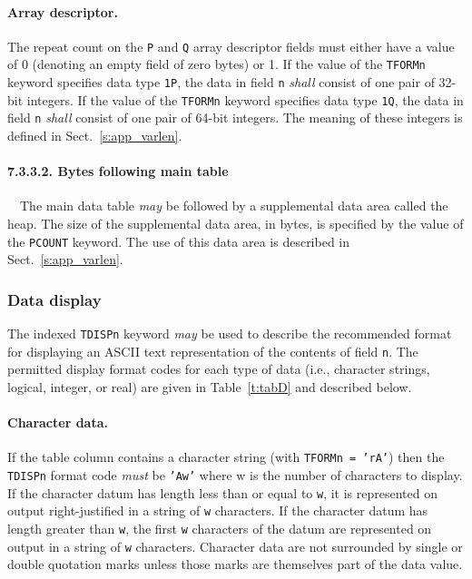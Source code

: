 \documentclass[onecolumn]{aa}
\begin{document}
    \paragraph{Array descriptor.}
    The repeat count on the {\tt P} and {\tt Q} array descriptor
    fields must either have a value of 0 (denoting an empty field of zero bytes) 
    or 1. If the value of the {\tt TFORMn} keyword 
    specifies data type {\tt 1P}, the data in 
    field {\tt n} {\em shall} consist of  
    one pair of 32-bit integers.
    If the value of the {\tt TFORMn} keyword 
    specifies data type {\tt 1Q}, the data in 
    field {\tt n} {\em shall} consist of 
    one pair of 64-bit integers.
    The meaning of these integers is defined
    in Sect.\ \ref{s:app_varlen}.

    \paragraph{7.3.3.2. Bytes following main table}

\ \newline \ \newline    The main data table {\em may} be followed by a supplemental data area called the heap. 
    The size of the supplemental data area, in bytes, is specified by the value of the 
    {\tt PCOUNT} keyword. The use of this data area is described in 
    Sect.\ \ref{s:app_varlen}. 

 \subsubsection{Data display}
 \label{s:BinDD}
 
 The indexed {\tt TDISPn} keyword {\em may} be used to describe the 
 recommended format for displaying an ASCII text representation 
 of the contents of field {\tt n}.
 The permitted display format codes for each 
 type of data (i.e., character strings, logical, integer, or real)
 are given in Table~\ref{t:tabD} and described below.

 \paragraph{Character data.} If the table column contains 
 a character string (with {\tt TFORMn = 'rA'}) then the {\tt TDISPn} 
 format code {\em must} be {\tt 'Aw'} where w is the number of characters
 to display.  If the
 character datum has length less than or equal to {\tt w}, it is represented
 on output right-justified in a string of {\tt w} characters.  If the
 character datum has length greater than {\tt w}, the first {\tt w} characters
 of the datum are represented on output in a string of {\tt w} characters.
 Character data are not surrounded by single or double quotation marks
 unless those marks are themselves part of the data value.
                                                  
\end{document}
